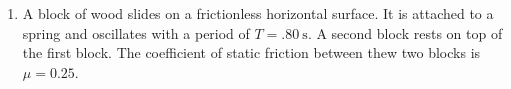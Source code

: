 \begin{enumerate}
\item A block of wood slides on a frictionless horizontal surface. It is
  attached to a spring and oscillates with a period of $T=\SI{.80}\second$. A
  second block rests on top of the first block. The coefficient of static
  friction between thew two blocks is $\mu=0.25$.
%  
\end{enumerate}

